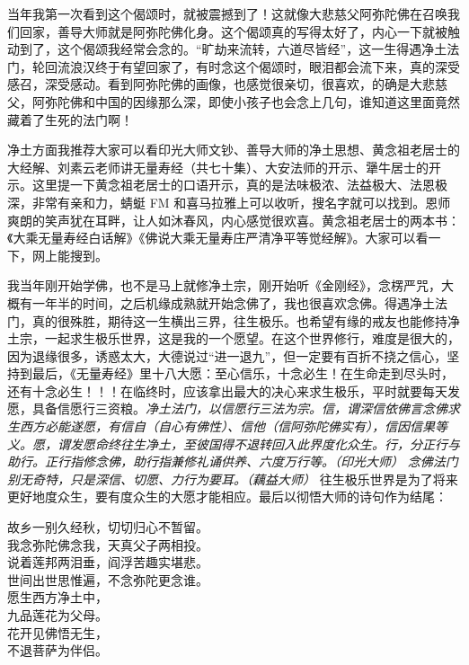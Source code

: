 当年我第一次看到这个偈颂时，就被震撼到了！这就像大悲慈父阿弥陀佛在召唤我们回家，善导大师就是阿弥陀佛化身。这个偈颂真的写得太好了，内心一下就被触动到了，这个偈颂我经常会念的。“旷劫来流转，六道尽皆经”，这一生得遇净土法门，轮回流浪汉终于有望回家了，有时念这个偈颂时，眼泪都会流下来，真的深受感召，深受感动。看到阿弥陀佛的画像，也感觉很亲切，很喜欢，的确是大悲慈父，阿弥陀佛和中国的因缘那么深，即使小孩子也会念上几句，谁知道这里面竟然藏着了生死的法门啊！

净土方面我推荐大家可以看印光大师文钞、善导大师的净土思想、黄念祖老居士的大经解、刘素云老师讲无量寿经（共七十集）、大安法师的开示、犟牛居士的开示。这里提一下黄念祖老居士的口语开示，真的是法味极浓、法益极大、法恩极深，非常有亲和力，蜻蜓 FM 和喜马拉雅上可以收听，搜名字就可以找到。恩师爽朗的笑声犹在耳畔，让人如沐春风，内心感觉很欢喜。黄念祖老居士的两本书：《大乘无量寿经白话解》《佛说大乘无量寿庄严清净平等觉经解》。大家可以看一下，网上能搜到。

我当年刚开始学佛，也不是马上就修净土宗，刚开始听《金刚经》，念楞严咒，大概有一年半的时间，之后机缘成熟就开始念佛了，我也很喜欢念佛。得遇净土法门，真的很殊胜，期待这一生横出三界，往生极乐。也希望有缘的戒友也能修持净土宗，一起求生极乐世界，这是我的一个愿望。在这个世界修行，难度是很大的，因为退缘很多，诱惑太大，大德说过“进一退九”，但一定要有百折不挠之信心，坚持到最后，《无量寿经》里十八大愿：至心信乐，十念必生！在生命走到尽头时，还有十念必生！！！在临终时，应该拿出最大的决心来求生极乐，平时就要每天发愿，具备信愿行三资粮。\textit{净土法门，以信愿行三法为宗。信，谓深信依佛言念佛求生西方必能遂愿，有信自（自心有佛性）、信他（信阿弥陀佛实有），信因信果等义。愿，谓发愿命终往生净土，至彼国得不退转回入此界度化众生。行，分正行与助行。正行指修念佛，助行指兼修礼诵供养、六度万行等。（印光大师）} \textit{念佛法门别无奇特，只是深信、切愿、力行为要耳。（藕益大师）} 往生极乐世界是为了将来更好地度众生，要有度众生的大愿才能相应。最后以彻悟大师的诗句作为结尾：

\begin{multicols}{2}
    \begin{center}
        故乡一别久经秋，切切归心不暂留。 \\ 我念弥陀佛念我，天真父子两相投。 \\ 说着莲邦两泪垂，阎浮苦趣实堪悲。 \\ 世间出世思惟遍，不念弥陀更念谁。 \\ 愿生西方净土中， \\ 九品莲花为父母。 \\ 花开见佛悟无生， \\ 不退菩萨为伴侣。
    \end{center}
\end{multicols}
